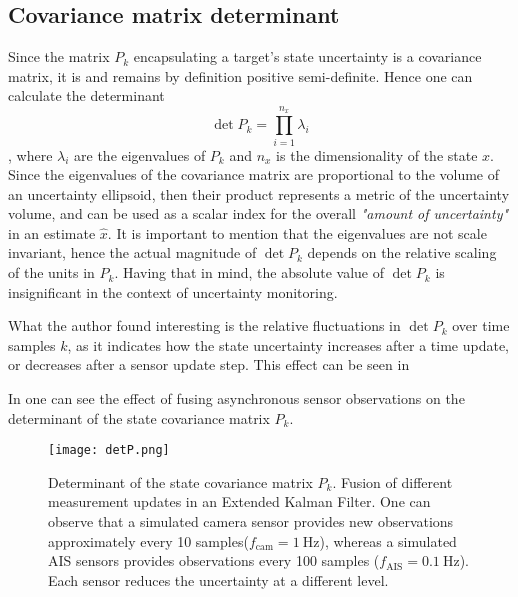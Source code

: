 \subsection{Covariance matrix determinant}


Since the matrix $P_k$ encapsulating a target's state uncertainty is a covariance matrix, it is and remains by definition positive semi-definite. Hence one can calculate the determinant $$\det{P_k} = \prod_{i=1}^{n_x} \lambda_i$$ , where $\lambda_i$ are the eigenvalues of $P_k$ and $n_x$ is the dimensionality of the state $x$. Since the eigenvalues of the covariance matrix are proportional to the volume of an uncertainty ellipsoid, then their product represents a metric of the uncertainty volume, and can be used as a scalar index for the overall \textit{"amount of uncertainty"} in an estimate $\hat{x}$. It is important to mention that the eigenvalues are not scale invariant, hence the actual magnitude of $\det{P_k}$ depends on the relative scaling of the units in $P_k$. Having that in mind, the absolute value of $\det{P_k}$ is insignificant in the context of uncertainty monitoring. 

What the author found interesting is the relative fluctuations in $\det{P_k}$ over time samples $k$, as it indicates how the state uncertainty increases after a time update, or decreases after a sensor update step. This effect can be seen in 

In  one can see the effect of fusing asynchronous sensor observations on the determinant of the state covariance matrix $P_k$.

\begin{figure}
	\centering
	\texttt{[image: detP.png]}
	\caption{Determinant of the state covariance matrix $P_k$. Fusion of different measurement updates in an Extended Kalman Filter. One can observe that a simulated camera sensor provides new observations approximately every 10 samples($f_{\text{cam}} = \SI{1}{\Hz}$), whereas a simulated AIS sensors provides observations every 100 samples ($f_{\text{AIS}} = \SI{0.1}{\Hz}$). Each sensor reduces the uncertainty at a different level.}
	\label{fig:detp}
\end{figure}

